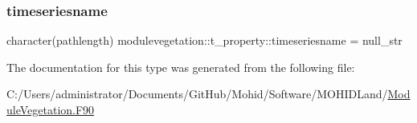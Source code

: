 \subsubsection{\texorpdfstring{timeseriesname}{timeseriesname}}
{\footnotesize\ttfamily character(pathlength) modulevegetation\+::t\+\_\+property\+::timeseriesname = null\+\_\+str\hspace{0.3cm}{\ttfamily [private]}}



The documentation for this type was generated from the following file\+:\begin{DoxyCompactItemize}
\item 
C\+:/\+Users/administrator/\+Documents/\+Git\+Hub/\+Mohid/\+Software/\+M\+O\+H\+I\+D\+Land/\mbox{\hyperlink{_module_vegetation_8_f90}{Module\+Vegetation.\+F90}}\end{DoxyCompactItemize}
